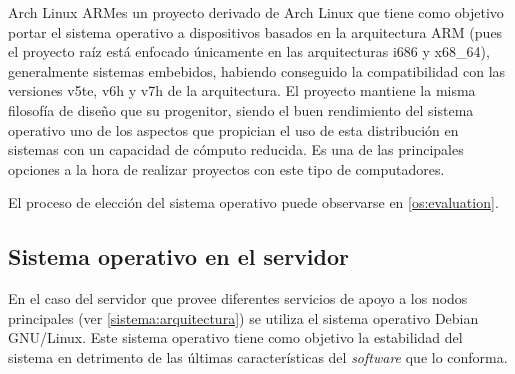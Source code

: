 Arch Linux ARM es un proyecto derivado de Arch Linux que tiene como objetivo portar el sistema operativo a dispositivos basados en la arquitectura ARM (pues el proyecto raíz está enfocado únicamente en las arquitecturas i686 y x68\_64), generalmente sistemas embebidos, habiendo conseguido la compatibilidad con las versiones v5te, v6h y v7h de la arquitectura. El proyecto mantiene la misma filosofía de diseño que su progenitor, siendo el buen rendimiento del sistema operativo uno de los aspectos que propician el uso de esta distribución en sistemas con un capacidad de cómputo reducida. Es una de las principales opciones a la hora de realizar proyectos con este tipo de computadores\cite{distrowatch:arm}.%






El proceso de elección del sistema operativo puede observarse en \ref{os:evaluation}.


\subsection{Sistema operativo en el servidor}

En el caso del servidor que provee diferentes servicios de apoyo a los nodos principales (ver \ref{sistema:arquitectura}) se utiliza el sistema operativo Debian GNU/Linux. Este sistema operativo tiene como objetivo la estabilidad del sistema en detrimento de las últimas características del \textit{software} que lo conforma.

